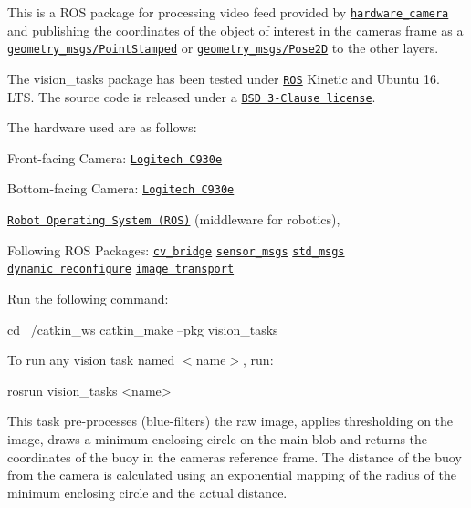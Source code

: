 This is a R\+OS package for processing video feed provided by \href{https://github.com/AUV-IITK/Hyperion-Software/tree/master/hardware_layer/hardware_camera}{\tt {\ttfamily hardware\+\_\+camera}} and publishing the coordinates of the object of interest in the camera\textquotesingle{}s frame as a \href{http://docs.ros.org/kinetic/api/geometry_msgs/html/msg/PointStamped.html}{\tt geometry\+\_\+msgs/\+Point\+Stamped} or \href{http://docs.ros.org/api/geometry_msgs/html/msg/Pose2D.html}{\tt geometry\+\_\+msgs/\+Pose2D} to the other layers.

The {\ttfamily vision\+\_\+tasks} package has been tested under \href{http://www.ros.org}{\tt R\+OS} Kinetic and Ubuntu 16. L\+TS. The source code is released under a \href{../../LICENSE}{\tt B\+SD 3-\/\+Clause license}.

The hardware used are as follows\+:
\begin{DoxyItemize}
\item Front-\/facing Camera\+: \href{https://www.logitech.com/en-in/product/c930e-webcam}{\tt Logitech C930e}
\item Bottom-\/facing Camera\+: \href{https://www.logitech.com/en-in/product/c930e-webcam}{\tt Logitech C930e}
\end{DoxyItemize}


\begin{DoxyItemize}
\item \href{http://wiki.ros.org}{\tt Robot Operating System (R\+OS)} (middleware for robotics),
\item Following R\+OS Packages\+: \href{http://wiki.ros.org/cv_bridge}{\tt cv\+\_\+bridge} \href{http://wiki.ros.org/sensor_msgs}{\tt sensor\+\_\+msgs} \href{http://wiki.ros.org/std_msgs}{\tt std\+\_\+msgs} \href{http://wiki.ros.org/dynamic_reconfigure}{\tt dynamic\+\_\+reconfigure} \href{http://wiki.ros.org/image_transport}{\tt image\+\_\+transport}
\end{DoxyItemize}

Run the following command\+: 
\begin{DoxyCode}
cd ~/catkin\_ws
catkin\_make --pkg vision\_tasks
\end{DoxyCode}


To run any vision task named {\ttfamily $<$name$>$}, run\+: 
\begin{DoxyCode}
rosrun vision\_tasks <name>
\end{DoxyCode}


This task pre-\/processes (blue-\/filters) the raw image, applies thresholding on the image, draws a minimum enclosing circle on the main blob and returns the coordinates of the buoy in the camera\textquotesingle{}s reference frame. The distance of the buoy from the camera is calculated using an exponential mapping of the radius of the minimum enclosing circle and the actual distance.


